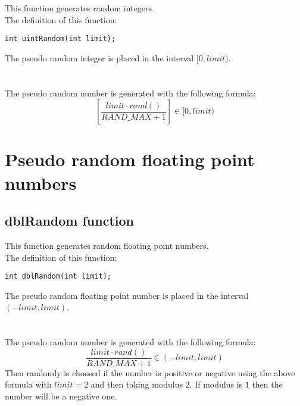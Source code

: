 This function generates random integers.\\

The definition of this function:
%
\begin{verbatim}
int uintRandom(int limit);  
\end{verbatim}
%
The pseudo random integer is placed in the interval $[0,limit)$.\\ \\
%
%
\ \\
%
The pseudo random number is generated with the following formula:
%
\begin{displaymath}
\left[ \frac{limit \cdot rand()}{RAND\_MAX + 1} \right] \in [0,limit)
\end{displaymath}
%

\section{Pseudo random floating point numbers}

\subsection{\textbf{dblRandom} function} \label{sec:dblRandom}

This function generates random floating point numbers.\\

The definition of this function:
%
\begin{verbatim}
int dblRandom(int limit);  
\end{verbatim}
%
The pseudo random floating point number is placed in the interval $(-limit,limit)$.\\ \\
%
%
\ \\
%
The pseudo random number is generated with the following formula:
%
\begin{displaymath}
\frac{limit \cdot rand()}{RAND\_MAX + 1} \in (-limit,limit)
\end{displaymath}
%
Then randomly is choosed if the number is positive or negative using the above formula with $limit=2$ and then taking modulus $2$. If modulus is $1$ then the number will be a negative one.

